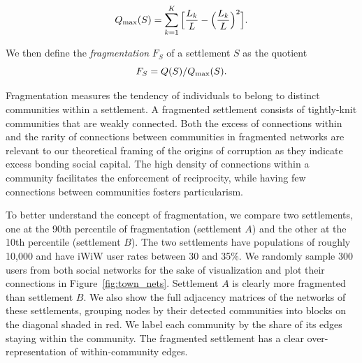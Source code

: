 $$ Q_{\rm max}(S) = \sum_{k=1}^{K} \Big[ \dfrac{L_{k}}{L} -\Big(\dfrac{L_{k}}{L}\Big)^{2} \Big].$$

\noindent We then define the \textit{fragmentation} $F_S$ of a settlement $S$ as the quotient
\begin{equation}
F_S=Q(S)/Q_{\rm max}(S).
\label{eq:fragmentation}
\end{equation}

\noindent Fragmentation measures the tendency of individuals to belong to distinct communities within a settlement. A fragmented settlement consists of tightly-knit communities that are weakly connected. Both the excess of connections within and the rarity of connections between communities in fragmented networks are relevant to our theoretical framing of the origins of corruption as they indicate excess bonding social capital. The high density of connections within a community facilitates the enforcement of reciprocity, while having few connections between communities fosters particularism.

To better understand the concept of fragmentation, we compare two settlements, one at the 90th percentile of fragmentation (settlement $A$) and the other at the 10th percentile (settlement $B$). The two settlements have populations of roughly 10,000 and have iWiW user rates between 30 and 35\%. We randomly sample 300 users from both social networks for the sake of visualization and plot their connections in Figure~\ref{fig:town_nets}. Settlement $A$ is clearly more fragmented than settlement $B$. We also show the full adjacency matrices of the networks of these settlements, grouping nodes by their detected communities into blocks on the diagonal shaded in red. We label each community by the share of its edges staying within the community. The fragmented settlement has a clear over-representation of within-community edges.


